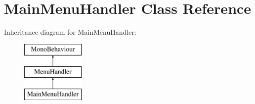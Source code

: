 \hypertarget{class_main_menu_handler}{}\section{Main\+Menu\+Handler Class Reference}
\label{class_main_menu_handler}
Inheritance diagram for Main\+Menu\+Handler\+:\begin{figure}[H]
\begin{center}
\leavevmode
\includegraphics[height=3.000000cm]{class_main_menu_handler}
\end{center}
\end{figure}
